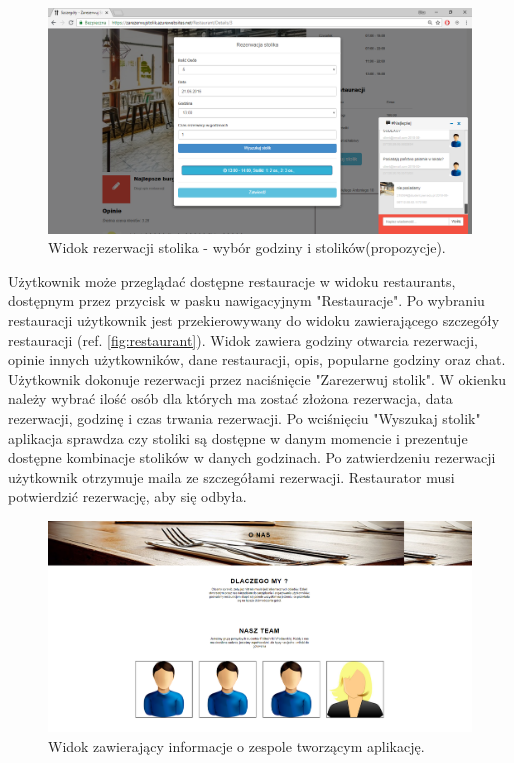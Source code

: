 \documentclass{article}
\begin{document}
\begin{figure}[H]
\centering
	\includegraphics[width=1.00\textwidth]{screens/reservation2.png}
	\caption[caption]{Widok rezerwacji stolika - wybór godziny i stolików(propozycje).}
	\label{fig:reservation}
\end{figure}

Użytkownik może przeglądać dostępne restauracje w widoku restaurants, dostępnym przez przycisk w pasku nawigacyjnym "Restauracje". Po wybraniu restauracji użytkownik jest przekierowywany do widoku zawierającego szczegóły restauracji (ref. \ref{fig:restaurant}). Widok zawiera godziny otwarcia rezerwacji, opinie innych użytkowników, dane restauracji, opis, popularne godziny oraz chat. Użytkownik dokonuje rezerwacji przez naciśnięcie "Zarezerwuj stolik". W okienku należy wybrać ilość osób dla których ma zostać złożona rezerwacja, data rezerwacji, godzinę i czas trwania rezerwacji. Po wciśnięciu "Wyszukaj stolik" aplikacja sprawdza czy stoliki są dostępne w danym momencie i prezentuje dostępne kombinacje stolików w danych godzinach. Po zatwierdzeniu rezerwacji użytkownik otrzymuje maila ze szczegółami rezerwacji. Restaurator musi potwierdzić rezerwację, aby się odbyła.

\begin{figure}[H]
\centering
	\includegraphics[width=1.00\textwidth]{screens/about.png}
	\caption[caption]{Widok zawierający informacje o zespole tworzącym aplikację.}
	\label{fig:about}
\end{figure}
\end{document}
